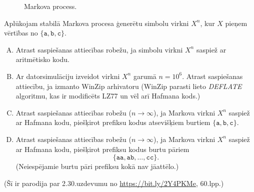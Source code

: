 \documentclass[a4paper]{article}
\begin{document}
\begin{figure}[!htb]
\caption{\label{fig:markov-chain} Markova process.}
\end{figure}

Aplūkojam stabilā Markova procesa ģenerētu simbolu virkni $X^n$, kur
$X$ pieņem vērtības no $\{\mathtt{a}, \mathtt{b}, \mathtt{c}\}$.
\begin{enumerate}[(A)]
\item Atrast saspiešanas attiecības robežu, ja simbolu virkni $X^n$ saspiež ar
aritmētisko kodu.
\item Ar datorsimulāciju izveidot virkni $X^n$ garumā $n = 10^6$.
Atrast saspiešanas attiecību, ja izmanto WinZip arhivatoru
(WinZip parasti lie\-to {\em DEFLATE} algoritmu, kas ir modificēts LZ77 un
vēl arī Hafmana kods.)
\item Atrast saspiešanas attiecības robežu ($n \rightarrow \infty$),
ja Markova virkni $X^n$ saspiež ar Hafmana kodu,
piešķirot prefiksu kodus atsevišķiem burtiem $\{\mathtt{a}, \mathtt{b}, \mathtt{c}\}$.
\item Atrast saspiešanas attiecības robežu ($n \rightarrow \infty$),
ja Markova virkni $X^n$ saspiež ar Hafmana kodu, piešķirot prefiksu kodus
burtu pāriem
$$\{\mathtt{aa}, \mathtt{ab}, \ldots, \mathtt{cc}\}.$$
(Neiespējamie burtu pāri prefiksu kokā nav jāattēlo.)
\end{enumerate}

(Šī ir parodija par 2.30.uzdevumu no \url{https://bit.ly/2Y4PKMe}, 60.lpp.)



\end{document}
